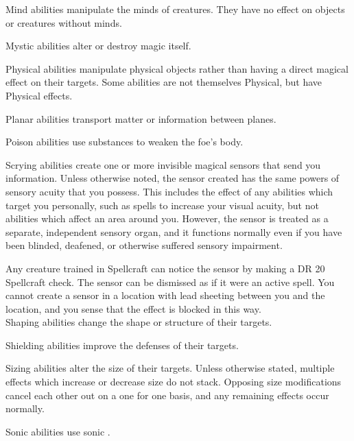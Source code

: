         Mind abilities manipulate the minds of creatures.
        They have no effect on objects or creatures without minds.

         Mystic abilities alter or destroy magic itself.

         Physical abilities manipulate physical objects rather than having a direct magical effect on their targets.
        Some abilities are not themselves Physical, but have Physical effects.

         Planar abilities transport matter or information between planes.

         Poison abilities use substances to weaken the foe's body.

         Scrying abilities create one or more invisible magical sensors that send you information.
        Unless otherwise noted, the sensor created has the same powers of sensory acuity that you possess.
        This includes the effect of any abilities which target you personally, such as spells to increase your visual acuity, but not abilities which affect an area around you.
        However, the sensor is treated as a separate, independent sensory organ, and it functions normally even if you have been blinded, deafened, or otherwise suffered sensory impairment.
        \par Any creature trained in Spellcraft can notice the sensor by making a DR 20 Spellcraft check.
        The sensor can be dismissed as if it were an active spell.
        You cannot create a sensor in a location with lead sheeting between you and the location, and you sense that the effect is blocked in this way.
        \\

         Shaping abilities change the shape or structure of their targets.

         Shielding abilities improve the defenses of their targets.

         Sizing abilities alter the size of their targets.
        Unless otherwise stated, multiple effects which increase or decrease size do not stack.
        Opposing size modifications cancel each other out on a one for one basis, and any remaining effects occur normally.

         Sonic abilities use sonic .

